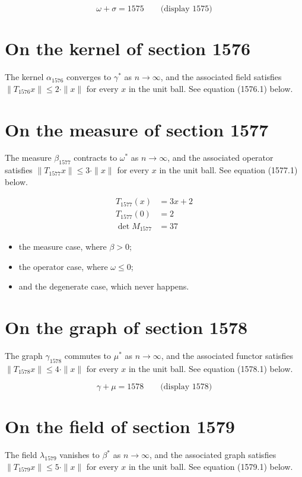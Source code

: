 \documentclass{article}
\begin{document}
$$
\omega + \sigma = 1575 \qquad \text{(display 1575)}
$$

\section{On the kernel of section 1576}
The kernel $\alpha_{1576}$ converges to $\gamma^{*}$ as $n \to \infty$,
and the associated field satisfies $\|T_{1576} x\| \leq 2 \cdot \|x\|$
for every $x$ in the unit ball. See equation (1576.1) below.

\section{On the measure of section 1577}
The measure $\beta_{1577}$ contracts to $\omega^{*}$ as $n \to \infty$,
and the associated operator satisfies $\|T_{1577} x\| \leq 3 \cdot \|x\|$
for every $x$ in the unit ball. See equation (1577.1) below.

\begin{align}
T_{1577}(x) &= 3 x + 2 \\
T_{1577}(0) &= 2 \\
\det M_{1577} &= 37
\end{align}

\begin{itemize}
  \item the measure case, where $\beta > 0$;
  \item the operator case, where $\omega \leq 0$;
  \item and the degenerate case, which never happens.
\end{itemize}

\section{On the graph of section 1578}
The graph $\gamma_{1578}$ commutes to $\mu^{*}$ as $n \to \infty$,
and the associated functor satisfies $\|T_{1578} x\| \leq 4 \cdot \|x\|$
for every $x$ in the unit ball. See equation (1578.1) below.

$$
\gamma + \mu = 1578 \qquad \text{(display 1578)}
$$

\section{On the field of section 1579}
The field $\lambda_{1579}$ vanishes to $\beta^{*}$ as $n \to \infty$,
and the associated graph satisfies $\|T_{1579} x\| \leq 5 \cdot \|x\|$
for every $x$ in the unit ball. See equation (1579.1) below.
\end{document}
